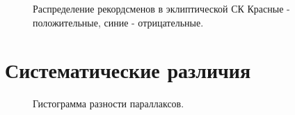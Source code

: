 \documentclass[14pt,aspectratio=43]{beamer}
\begin{document}
\begin{frame}[<alignment>]
\begin{figure}[h!]
\caption{Распределение рекордсменов в эклиптической СК Красные - положительные, синие - отрицательные.}
\label{img:75maxlonlat}
\end{figure}
\end{frame}	


\section{Систематические различия}\label{sistem}

\begin{frame}[<alignment>]
\begin{figure}[h!]
\caption{Гистограмма разности параллаксов.}
\label{img:hist_par_deff}
\end{figure}
\end{frame}
\end{document}
